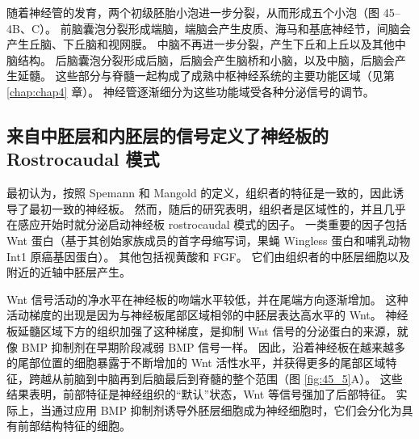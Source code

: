 随着神经管的发育，两个初级胚胎小泡进一步分裂，从而形成五个小泡（图 45–4B、C）。 前脑囊泡分裂形成端脑，端脑会产生皮质、海马和基底神经节，间脑会产生丘脑、下丘脑和视网膜。 中脑不再进一步分裂，产生下丘和上丘以及其他中脑结构。 后脑囊泡分裂形成后脑，后脑会产生脑桥和小脑，以及中脑，后脑会产生延髓。 这些部分与脊髓一起构成了成熟中枢神经系统的主要功能区域（见第 \ref{chap:chap4} 章）。 神经管逐渐细分为这些功能域受各种分泌信号的调节。

\subsection{来自中胚层和内胚层的信号定义了神经板的 Rostrocaudal 模式}
最初认为，按照 Spemann 和 Mangold 的定义，组织者的特征是一致的，因此诱导了最初一致的神经板。 然而，随后的研究表明，组织者是区域性的，并且几乎在感应开始时就分泌启动神经板 rostrocaudal 模式的因子。 一类重要的因子包括 Wnt 蛋白（基于其创始家族成员的首字母缩写词，果蝇 Wingless 蛋白和哺乳动物 Int1 原癌基因蛋白）。 其他包括视黄酸和 FGF。 它们由组织者的中胚层细胞以及附近的近轴中胚层产生。

Wnt 信号活动的净水平在神经板的吻端水平较低，并在尾端方向逐渐增加。 这种活动梯度的出现是因为与神经板尾部区域相邻的中胚层表达高水平的 Wnt。 神经板延髓区域下方的组织加强了这种梯度，是抑制 Wnt 信号的分泌蛋白的来源，就像 BMP 抑制剂在早期阶段减弱 BMP 信号一样。 
因此，沿着神经板在越来越多的尾部位置的细胞暴露于不断增加的 Wnt 活性水平，并获得更多的尾部区域特征，跨越从前脑到中脑再到后脑最后到脊髓的整个范围（图 \ref{fig:45_5}A）。 
这些结果表明，前部特征是神经组织的“默认”状态，Wnt 等信号强加了后部特征。 实际上，当通过应用 BMP 抑制剂诱导外胚层细胞成为神经细胞时，它们会分化为具有前部结构特征的细胞。

